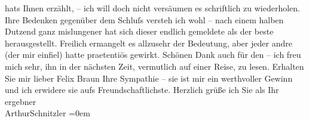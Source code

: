 \begin{ledgroupsized}[t]{13cm}
               hats Ihnen erzählt, – ich will doch nicht versäumen es schriftlich zu wiederholen.
               Ihre Bedenken gegenüber dem Schluſs versteh ich wohl – nach einem halben Dutzend ganz
               mislungener hat sich dieser endlich gemeldete als der beste herausgestellt. Freilich
               ermangelt es allzusehr der Bedeutung, aber jeder andre (der mir einfiel) hatte
               praetentiös gewirkt.\pend
           \pstart
           Schönen Dank auch für den \label{K_L02487-1v}\label{K_L02487-1h} – ich freu mich sehr, ihn in der nächsten Zeit, vermutlich auf
               einer Reise, zu lesen. Erhalten Sie mir lieber Felix Braun Ihre Sympathie – {\pb}sie ist mir ein werthvoller Gewinn und ich
               erwidere sie aufs Freundschaftlichste.\pend
           \pstart
           Herzlich grüße ich Sie als Ihr ergebner{\\[\baselineskip]}\spacefill\mbox{ArthurSchnitzler}\pend
           \leftskip=0em{}
         
         \endnumbering{}\end{ledgroupsized}  \newcommand{\dateiname}{L02487}\newcommand{\titel}{Arthur Schnitzler an Felix Braun, 28. 5. 1927}\newcommand{\editorInnen}{Martin Anton Müller und Gerd-Hermann Susen}
      